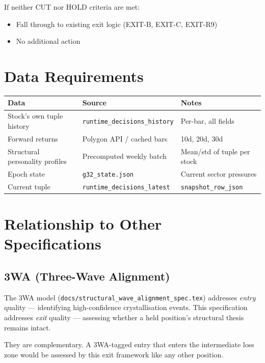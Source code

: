 \documentclass[11pt, a4paper]{article}
\begin{document}
If neither CUT nor HOLD criteria are met:
\begin{itemize}
  \item Fall through to existing exit logic (EXIT-B, EXIT-C, EXIT-R9)
  \item No additional action
\end{itemize}

\section{Data Requirements}

\begin{table}[h!]
\centering
\begin{tabular}{lll}
\toprule
\textbf{Data} & \textbf{Source} & \textbf{Notes} \\
\midrule
Stock's own tuple history & \texttt{runtime\_decisions\_history} & Per-bar, all fields \\
Forward returns & Polygon API / cached bars & 10d, 20d, 30d \\
Structural personality profiles & Precomputed weekly batch & Mean/std of tuple per stock \\
Epoch state & \texttt{g32\_state.json} & Current sector pressures \\
Current tuple & \texttt{runtime\_decisions\_latest} & \texttt{snapshot\_row\_json} \\
\bottomrule
\end{tabular}
\end{table}

\section{Relationship to Other Specifications}

\subsection{3WA (Three-Wave Alignment)}

The 3WA model (\texttt{docs/structural\_wave\_alignment\_spec.tex}) addresses
\emph{entry} quality --- identifying high-confidence crystallisation events.
This specification addresses \emph{exit} quality --- assessing whether a
held position's structural thesis remains intact.

They are complementary. A 3WA-tagged entry that enters the intermediate loss
zone would be assessed by this exit framework like any other position.
\end{document}
